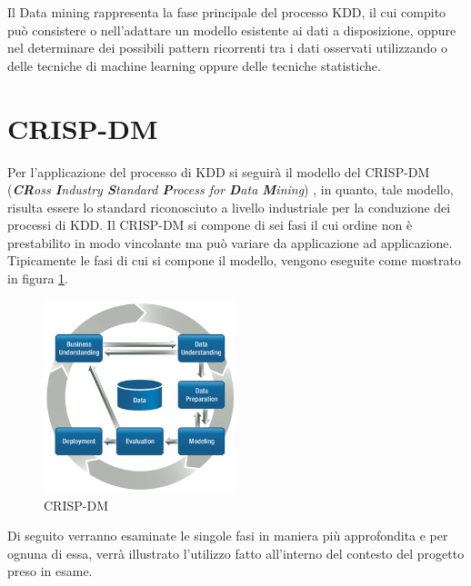 Il Data mining rappresenta la fase principale del processo KDD, il cui compito può consistere o nell'adattare un modello esistente ai dati a disposizione, oppure nel determinare dei possibili pattern ricorrenti tra i dati osservati utilizzando o delle tecniche di machine learning oppure delle tecniche statistiche. 

\section{CRISP-DM}
Per l'applicazione del processo di KDD si seguirà il modello del CRISP-DM (\emph{\textbf{CR}oss \textbf{I}ndustry \textbf{S}tandard \textbf{P}rocess for \textbf{D}ata \textbf{M}ining})
\cite{wirth2000crisp}
, in quanto, tale modello, risulta essere lo standard riconosciuto a livello industriale per la conduzione dei processi di KDD.
Il CRISP-DM si compone di sei fasi il cui ordine non è prestabilito in modo vincolante ma può variare da applicazione ad applicazione. Tipicamente le fasi di cui si compone il modello, vengono eseguite come mostrato in figura \ref{CRISPDM}.

\begin{figure}[hbtp]
\centering
\includegraphics[width=0.5\textwidth]{./images/CRISPDM.png}
\caption{CRISP-DM}
\label{CRISPDM}
\end{figure}

Di seguito verranno esaminate le singole fasi in maniera più approfondita e per ognuna di essa, verrà illustrato l'utilizzo fatto all'interno del contesto del progetto preso in esame.